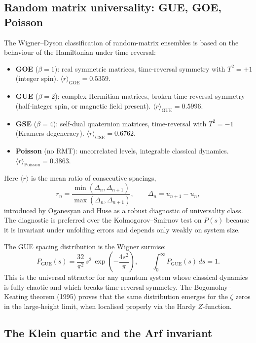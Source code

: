 \documentclass[11pt,a4paper]{article}
\theoremstyle{plain}
\theoremstyle{definition}
\theoremstyle{remark}
\newcommand{\rh}{\langle r\rangle}
\begin{document}
\subsection{Random matrix universality: GUE, GOE, Poisson}

The Wigner--Dyson classification of random-matrix ensembles is based on the behaviour of the Hamiltonian under time reversal:
\begin{itemize}[leftmargin=*,itemsep=2pt]
    \item \textbf{GOE} ($\beta = 1$): real symmetric matrices, time-reversal symmetry with $T^2 = +1$ (integer spin). $\rh_{\mathrm{GOE}} = 0.5359$.
    \item \textbf{GUE} ($\beta = 2$): complex Hermitian matrices, broken time-reversal symmetry (half-integer spin, or magnetic field present). $\rh_{\mathrm{GUE}} = 0.5996$.
    \item \textbf{GSE} ($\beta = 4$): self-dual quaternion matrices, time-reversal with $T^2 = -1$ (Kramers degeneracy). $\rh_{\mathrm{GSE}} = 0.6762$.
    \item \textbf{Poisson} (no RMT): uncorrelated levels, integrable classical dynamics. $\rh_{\mathrm{Poisson}} = 0.3863$.
\end{itemize}
Here $\rh$ is the mean ratio of consecutive spacings,
\begin{equation}
    r_n = \frac{\min(\Delta_n, \Delta_{n+1})}{\max(\Delta_n, \Delta_{n+1})},\qquad \Delta_n = u_{n+1} - u_n,
\end{equation}
introduced by Oganesyan and Huse as a robust diagnostic of universality class. The diagnostic is preferred over the Kolmogorov--Smirnov test on $P(s)$ because it is invariant under unfolding errors and depends only weakly on system size.

The GUE spacing distribution is the Wigner surmise:
\begin{equation}\label{eq:Wigner}
    P_{\mathrm{GUE}}(s) = \frac{32}{\pi^2}\,s^2\,\exp\!\left(-\frac{4s^2}{\pi}\right),
    \qquad \int_0^\infty P_{\mathrm{GUE}}(s)\,ds = 1.
\end{equation}
This is the universal attractor for any quantum system whose classical dynamics is fully chaotic and which breaks time-reversal symmetry. The Bogomolny--Keating theorem (1995) proves that the same distribution emerges for the $\zeta$ zeros in the large-height limit, when localised properly via the Hardy $Z$-function.

\subsection{The Klein quartic and the Arf invariant}
\end{document}
